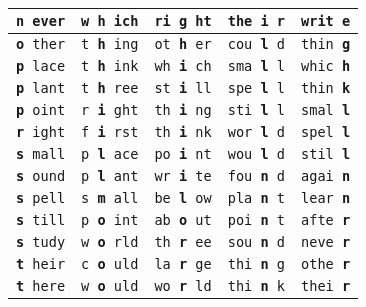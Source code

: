 \documentclass[]{article}
\begin{document}
\begin{tabular}{|l|l|l|l|l|}
\hline \rule[-1ex]{0pt}{3.5ex} \texttt{\textbf{n} ever} & \texttt{w \textbf{h} ich} & \texttt{ri \textbf{g} ht} & \texttt{the \textbf{i} r} & \texttt{writ \textbf{e}} \\
\hline \rule[-1ex]{0pt}{3.5ex} \texttt{\textbf{o} ther} & \texttt{t \textbf{h} ing} & \texttt{ot \textbf{h} er} & \texttt{cou \textbf{l} d} & \texttt{thin \textbf{g}} \\
\hline \rule[-1ex]{0pt}{3.5ex} \texttt{\textbf{p} lace} & \texttt{t \textbf{h} ink} & \texttt{wh \textbf{i} ch} & \texttt{sma \textbf{l} l} & \texttt{whic \textbf{h}} \\
\hline \rule[-1ex]{0pt}{3.5ex} \texttt{\textbf{p} lant} & \texttt{t \textbf{h} ree} & \texttt{st \textbf{i} ll} & \texttt{spe \textbf{l} l} & \texttt{thin \textbf{k}} \\
\hline \rule[-1ex]{0pt}{3.5ex} \texttt{\textbf{p} oint} & \texttt{r \textbf{i} ght} & \texttt{th \textbf{i} ng} & \texttt{sti \textbf{l} l} & \texttt{smal \textbf{l}} \\
\hline \rule[-1ex]{0pt}{3.5ex} \texttt{\textbf{r} ight} & \texttt{f \textbf{i} rst} & \texttt{th \textbf{i} nk} & \texttt{wor \textbf{l} d} & \texttt{spel \textbf{l}} \\
\hline \rule[-1ex]{0pt}{3.5ex} \texttt{\textbf{s} mall} & \texttt{p \textbf{l} ace} & \texttt{po \textbf{i} nt} & \texttt{wou \textbf{l} d} & \texttt{stil \textbf{l}} \\
\hline \rule[-1ex]{0pt}{3.5ex} \texttt{\textbf{s} ound} & \texttt{p \textbf{l} ant} & \texttt{wr \textbf{i} te} & \texttt{fou \textbf{n} d} & \texttt{agai \textbf{n}} \\
\hline \rule[-1ex]{0pt}{3.5ex} \texttt{\textbf{s} pell} & \texttt{s \textbf{m} all} & \texttt{be \textbf{l} ow} & \texttt{pla \textbf{n} t} & \texttt{lear \textbf{n}} \\
\hline \rule[-1ex]{0pt}{3.5ex} \texttt{\textbf{s} till} & \texttt{p \textbf{o} int} & \texttt{ab \textbf{o} ut} & \texttt{poi \textbf{n} t} & \texttt{afte \textbf{r}} \\
\hline \rule[-1ex]{0pt}{3.5ex} \texttt{\textbf{s} tudy} & \texttt{w \textbf{o} rld} & \texttt{th \textbf{r} ee} & \texttt{sou \textbf{n} d} & \texttt{neve \textbf{r}} \\
\hline \rule[-1ex]{0pt}{3.5ex} \texttt{\textbf{t} heir} & \texttt{c \textbf{o} uld} & \texttt{la \textbf{r} ge} & \texttt{thi \textbf{n} g} & \texttt{othe \textbf{r}} \\
\hline \rule[-1ex]{0pt}{3.5ex} \texttt{\textbf{t} here} & \texttt{w \textbf{o} uld} & \texttt{wo \textbf{r} ld} & \texttt{thi \textbf{n} k} & \texttt{thei \textbf{r}} \\

\end{tabular}
\end{document}
